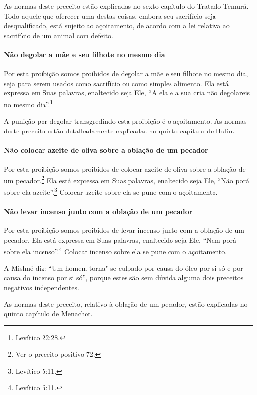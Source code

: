 \begin{multicols}{2}
As normas deste preceito estão explicadas no sexto capítulo do Tratado
Temurá\starr. Todo aquele que oferecer uma destas coisas, embora seu
sacrifício seja desqualificado, está sujeito ao açoitamento, de acordo
com a lei relativa ao sacrifício de um animal com defeito.

\paragraph{Não degolar a mãe e seu filhote no mesmo dia}

Por esta proibição somos proibidos de degolar a mãe e seu filhote no
mesmo dia, seja para serem usados como sacrifício ou como simples
alimento. Ela está expressa em Suas palavras, enaltecido seja Ele, ``A
ela e a sua cria não degolareis no mesmo dia''.\footnote{Levítico 22:28.}

A punição por degolar transgredindo esta proibição é o açoitamento. As
normas deste preceito estão detalhadamente explicadas no quinto
capítulo de Hulin\starr.

\paragraph{Não colocar azeite de oliva sobre a oblação de um pecador}

Por esta proibição somos proibidos de colocar azeite de oliva sobre a
oblação de um pecador.\footnote{Ver o preceito positivo 72.} Ela está expressa em Suas
palavras, enaltecido seja Ele, ``Não porá sobre ela azeite''.\footnote{Levítico
5:11.} Colocar azeite sobre ela se pune com o açoitamento.

\paragraph{Não levar incenso junto com a oblação de um pecador}

Por esta proibição somos proibidos de levar incenso junto com a oblação
de um pecador. Ela está expressa em Suas palavras, enaltecido seja Ele,
``Nem porá sobre ela incenso''.\footnote{Levítico 5:11.} Colocar incenso sobre
ela se pune com o açoitamento.

A Mishné diz: ``Um homem torna"-se culpado por causa do óleo por si só e
por causa do incenso por si só'', porque estes são sem dúvida alguma
dois preceitos negativos independentes.

As normas deste preceito, relativo à oblação de um pecador, estão
explicadas no quinto capítulo de Menachot\starr.


\end{multicols}
